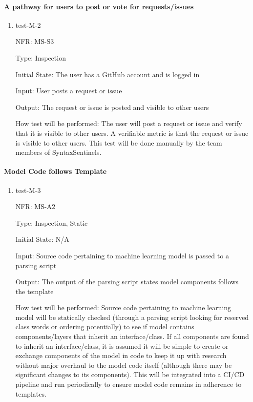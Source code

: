 \documentclass[12pt, titlepage]{article}
\begin{document}
\paragraph{A pathway for users to post or vote for requests/issues}

\begin{enumerate}
  \item{test-M-2}

  NFR: MS-S3

  Type: Inspection

  Initial State: The user has a GitHub account and is logged in

  Input: User posts a request or issue

  Output: The request or issue is posted and visible to other users

  How test will be performed:
  The user will post a request or issue and verify that it is visible to other users. A verifiable metric is that the request or issue is visible to other users.
  This test will be done manually by the team members of SyntaxSentinels.
\end{enumerate}

\paragraph{Model Code follows Template }

\begin{enumerate}
  \item{test-M-3}

  NFR: MS-A2

  Type: Inspection, Static

  Initial State: N/A

  Input: Source code pertaining to machine learning model is passed to a parsing script

  Output: The output of the parsing script states model components follows the template

  How test will be performed:
  Source code pertaining to machine learning model will be statically checked
(through a parsing script looking for reserved class words or ordering potentially) 
to see if model contains components/layers that inherit an interface/class. If all 
components are found to inherit an interface/class, it is assumed it will be simple 
to create or exchange components of the model in code to keep it up with research 
without major overhaul to the model code itself (although there may be significant
changes to its components). This will be integrated into a CI/CD pipeline and run
periodically to ensure model code remains in adherence to templates.
\end{enumerate}
\end{document}
